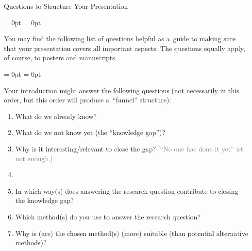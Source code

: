 \documentclass[aspectratio = 169, t, 10pt]{beamer}
\begin{document}
\begin{frame}[allowframebreaks]{Questions to Structure Your Presentation}

\begin{list}{}{\leftmargin = 0pt \itemindent = 0pt}
	\item You may find the following list of questions helpful as a~guide to making sure that your presentation covers all important aspects. The questions equally apply, of course, to posters and manuscripts.
\end{list}

\framebreak

\bgroup
{}
\begin{list}{}{\leftmargin = 0pt \itemindent = 0pt}
	\item Your introduction might answer the following questions (not necessarily in this order, but this order will produce a~``funnel'' structure):
\end{list}
\begin{enumerate}
	\item What do we already know?
	\item What do we not know yet (the ``knowledge gap'')?
	\item Why is it interesting\slash relevant to close the gap? \textcolor{gray}{[``No one has done it yet'' ist not enough.]}
	\item {}
	\item In which way(s) does answering the research question contribute to closing the knowledge gap?
	\item Which method(s) do you use to answer the research question?
	\item Why is (are) the chosen method(s) (more) suitable (than potential alternative methods)?
\end{enumerate}

\framebreak


\end{frame}
\end{document}
